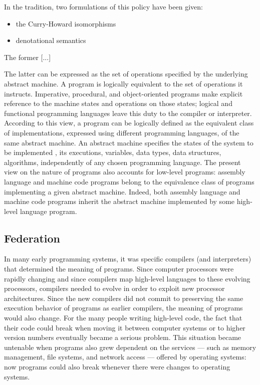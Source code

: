 \documentclass[]{article}
\begin{document}
In the tradition, two formulations of this policy have been given:

\begin{itemize}
\item the Curry-Howard isomorphisms
\item denotational semantics
\end{itemize}




{\color{red}{this passage is inspired by Jean-Baptiste's note}}


The former [...]

The latter can be expressed as the set of operations specified by the underlying abstract machine. A program is logically equivalent to the set of
operations it instructs. Imperative, procedural, and object-oriented programs make explicit reference to the machine states and operations on those states; logical and functional programming languages leave this duty to the compiler or interpreter.  According to this view, a program can be logically defined as the equivalent class of implementations, expressed using different programming languages, of the same abstract machine. An abstract machine specifies the states of the system to be  implemented , its executions, variables, data types, data structures, algorithms, independently of any chosen programming language. The present view on the nature of programs also accounts for low-level programs: assembly language and machine code programs belong to the equivalence class of programs implementing a given abstract machine. Indeed, both assembly language and machine code programs inherit the abstract machine implemented by some high-level language program.



\subsection{Federation}


{\color{red}{this passage is inspired by Dale's note}}


In many early programming systems, it was specific compilers (and interpreters) that determined the meaning of programs. Since computer processors were rapidly changing and since compilers map high-level languages to these evolving processors, compilers needed to evolve in order to exploit new processor architectures. Since the new compilers did not commit to preserving the same execution behavior of programs
as earlier compilers, the meaning of programs would also change. For
the many people writing high-level code, the fact that their code
could break when moving it between computer systems or to higher
version numbers eventually became a serious problem. This situation
became untenable when programs also grew dependent on the
services --- such as memory management, file systems, and network
access --- offered by operating systems: now programs could also break
whenever there were changes to operating systems.
\end{document}
